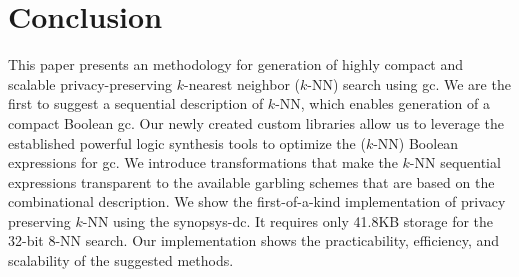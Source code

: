 \begin{table}
\centering
\caption{Circuit size and timing evaluation for $k$-NN search.}
\label{tab:k_nns}
\end{table}

\section{Conclusion}\label{sec:knn-conc}
This paper presents an methodology for generation of highly compact and scalable privacy-preserving $k$-nearest neighbor ($k$-NN) search using \acrshort{gc}.
We are the first to suggest a sequential description of $k$-NN, which enables generation of a compact Boolean \acrshort{gc}.
Our newly created custom libraries allow us to leverage the established powerful logic synthesis tools to optimize the ($k$-NN) Boolean expressions for \acrshort{gc}.
We introduce transformations that make the $k$-NN sequential expressions transparent to the available garbling schemes that are based on the combinational description.
We show the first-of-a-kind implementation of privacy preserving $k$-NN using the \acrfull{synopsys-dc}.
It requires only 41.8KB storage for the 32-bit 8-NN search.
Our implementation shows the practicability, efficiency, and scalability of the suggested methods.
